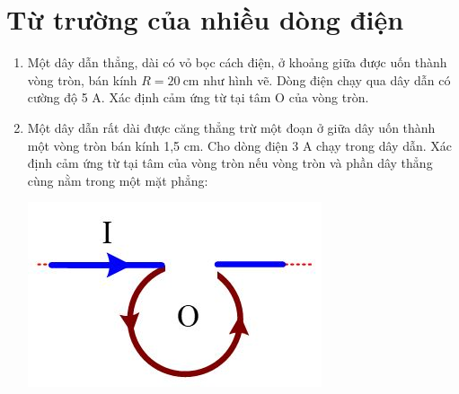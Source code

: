 \section{Từ trường của nhiều dòng điện}
\begin{enumerate}
	\item {Một dây dẫn thẳng, dài có vỏ bọc cách điện, ở khoảng giữa được uốn thành vòng tròn, bán kính $R = 20\ \text{cm}$ như hình vẽ. Dòng điện chạy qua dây dẫn có cường độ 5 A. Xác định cảm ứng từ tại tâm O của vòng tròn.
	}
	\item{Một dây dẫn rất dài được căng thẳng trừ một đoạn ở giữa dây uốn thành một vòng tròn bán kính 1,5 cm. Cho dòng điện 3 A chạy trong dây dẫn. Xác định cảm ứng từ tại tâm của vòng tròn nếu vòng tròn và phần dây thẳng cùng nằm trong một mặt phẳng:	 
		\begin{center}
			\includegraphics[scale=0.6]{../figs/VN11-PH-26-P-017-1-1.JPG}
		\end{center}
		
}
\end{enumerate}
